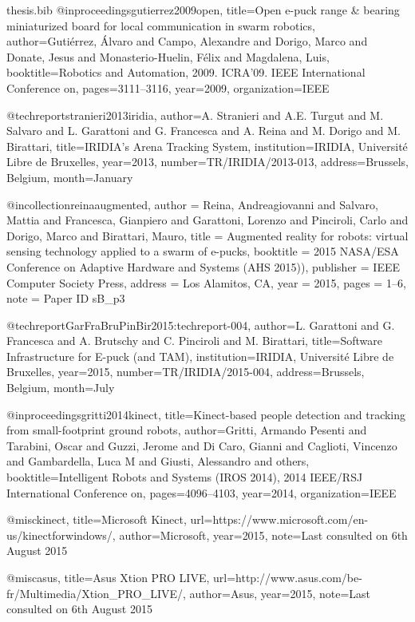 \documentclass[oneside, a4paper, 12pt]{memoir}
\begin{document}
\begin{filecontents}{thesis.bib}
@inproceedings{gutierrez2009open,
  title={Open e-puck range \& bearing miniaturized board for local communication in swarm robotics},
  author={Guti{\'e}rrez, {\'A}lvaro and Campo, Alexandre and Dorigo, Marco and Donate, Jesus and Monasterio-Huelin, F{\'e}lix and Magdalena, Luis},
  booktitle={Robotics and Automation, 2009. ICRA'09. IEEE International Conference on},
  pages={3111--3116},
  year={2009},
  organization={IEEE}
}

@techreport{stranieri2013iridia,
  author={A. Stranieri and A.E. Turgut and M. Salvaro and L. Garattoni and G. Francesca and A. Reina and M. Dorigo and  M. Birattari},
  title={IRIDIA's Arena Tracking System},
  institution={IRIDIA, Universit{\'e} Libre de Bruxelles},
  year={2013},
  number={TR/IRIDIA/2013-013},
  address={Brussels, Belgium},
  month={January}
}

@incollection{reinaaugmented,
  author = {Reina, Andreagiovanni and Salvaro, Mattia and Francesca, Gianpiero and Garattoni, Lorenzo and Pinciroli, Carlo and Dorigo, Marco and Birattari, Mauro},
  title = {Augmented reality for robots: virtual sensing technology applied to a swarm of e-pucks},
  booktitle = {2015 {NASA/ESA} Conference on Adaptive Hardware and Systems ({AHS 2015}))},
  publisher = {{IEEE} Computer Society Press},
  address = {Los Alamitos, CA},
  year = {2015},
  pages = {1--6},
  note = {Paper ID sB\_p3}
}

@techreport{GarFraBruPinBir2015:techreport-004,
 author={L. Garattoni and G. Francesca and A. Brutschy and C. Pinciroli and M. Birattari},
 title={Software Infrastructure for E-puck (and TAM)},
 institution={IRIDIA, Universit{\'e} Libre de Bruxelles},
 year={2015},
 number={TR/IRIDIA/2015-004},
 address={Brussels, Belgium},
 month={July}
}

@inproceedings{gritti2014kinect,
  title={Kinect-based people detection and tracking from small-footprint ground robots},
  author={Gritti, Armando Pesenti and Tarabini, Oscar and Guzzi, Jerome and Di Caro, Gianni and Caglioti, Vincenzo and Gambardella, Luca M and Giusti, Alessandro and others},
  booktitle={Intelligent Robots and Systems (IROS 2014), 2014 IEEE/RSJ International Conference on},
  pages={4096--4103},
  year={2014},
  organization={IEEE}
}

@misc{kinect,
	title={Microsoft Kinect},
	url={https://www.microsoft.com/en-us/kinectforwindows/},
	author={Microsoft},
	year={2015},
	note={Last consulted on 6th August 2015}
}

@misc{asus,
	title={Asus Xtion PRO LIVE},
	url={http://www.asus.com/be-fr/Multimedia/Xtion_PRO_LIVE/},
	author={Asus},
	year={2015},
	note={Last consulted on 6th August 2015}
}


\end{filecontents}
\end{document}
